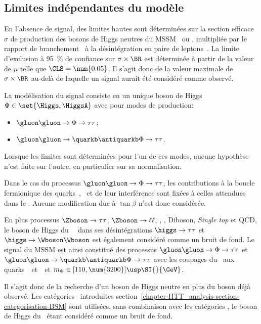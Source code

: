 \subsection{Limites indépendantes du modèle}\label{chapter-HTT_analysis-section-signal_extraction-model_indep_and_likelihood}
En l'absence de signal, des limites hautes sont déterminées sur la section efficace $\sigma$ de production des bosons de Higgs neutres du MSSM \Higgs\ ou \HiggsA, multipliée par le rapport de branchement \BR\ à la désintégration en paire de leptons~\tau.
La limite d'exclusion à \SI{95}{\%} de confiance sur $\sigma\times\BR$ est déterminée à partir de la valeur de $\mu$ telle que $\CLS = \num{0.05}$.
Il s'agit donc de la valeur maximale de $\sigma\times\BR$ au-delà de laquelle un signal aurait été considéré comme observé.
\par
La modélisation du signal consiste en un unique boson de Higgs $\Phi \in \set{ \Higgs , \HiggsA }$ avec pour modes de production:
\begin{itemize}
\item $\gluon\gluon\to\Phi\to\tau\tau$;
\item $\gluon\gluon\to\quarkb\antiquarkb\Phi\to\tau\tau$.
\end{itemize}
Lorsque les limites sont déterminées pour l'un de ces modes, aucune hypothèse n'est faite sur l'autre, en particulier sur sa normalisation.
\par
Dans le cas du processus $\gluon\gluon\to\Phi\to\tau\tau$, les contributions à la boucle fermionique des quarks~\quarkt, \quarkb\ et de leur interférence sont fixées à celles attendues dans le \SM.
Aucune modification due à $\tan\beta$ n'est donc considérée.
\par
En plus processus
$\Zboson\to\tau\tau$,
$\Zboson\to\ell\ell$,
\Wjets,
\ttbar,
Diboson, \emph{Single top}
et
QCD,
le boson de Higgs du \SM\ \higgs\ dans ses désintégrations
$\higgs\to\tau\tau$
et
$\higgs\to\Wboson\Wboson$
est également considéré comme un bruit de fond.
Le signal du MSSM est ainsi constitué des processus
$\gluon\gluon\to\Phi\to\tau\tau$
et
$\gluon\gluon\to\quarkb\antiquarkb\Phi\to\tau\tau$
avec les coupages du \SM\ aux quarks~\quarkt\ et~\quarkb\
et $m_\Phi\in[110, \num{3200}]\usp\SI{}{\GeV}$.
\par
Il s'agit donc de la recherche d'un boson de Higgs neutre en plus du boson déjà observé.
Les catégories \CATbsm\ introduites section~\ref{chapter-HTT_analysis-section-categorisation-BSM} sont utilisées, sans combinaison avec les catégories \CATsm, le boson de Higgs du \SM\ étant considéré comme un bruit de fond.